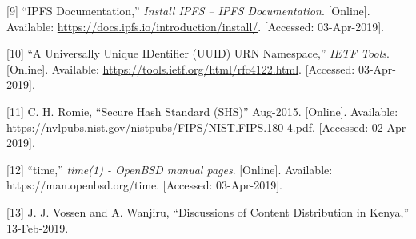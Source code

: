 \documentclass{article}
\begin{document}
[9] ``IPFS Documentation,'' \textit{Install IPFS – IPFS Documentation}. [Online]. Available: \url{https://docs.ipfs.io/introduction/install/}. [Accessed: 03-Apr-2019]. 

[10] ``A Universally Unique IDentifier (UUID) URN Namespace,''
\textit{IETF Tools}. [Online]. Available:
\url{https://tools.ietf.org/html/rfc4122.html}. [Accessed:
03-Apr-2019].

[11] C. H. Romie, ``Secure Hash Standard (SHS)'' Aug-2015. [Online]. Available: \url{https://nvlpubs.nist.gov/nistpubs/FIPS/NIST.FIPS.180-4.pdf}. [Accessed: 02-Apr-2019].

[12] ``time,'' \textit{time(1) - OpenBSD manual pages}. [Online]. Available: https://man.openbsd.org/time. [Accessed: 03-Apr-2019].

[13] J. J. Vossen and A. Wanjiru, ``Discussions of Content Distribution in Kenya,'' 13-Feb-2019. 
\end{document}
